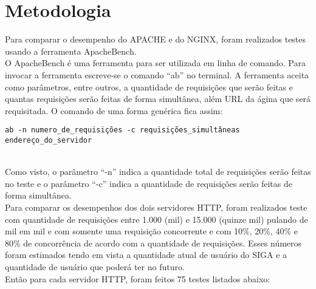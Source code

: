 \chapter{Metodologia}\label{metodologia}

Para comparar o desempenho do APACHE e do NGINX, foram realizados testes usando a ferramenta ApacheBench.\\

O ApacheBench é uma ferramenta para ser utilizada em linha de comando. Para invocar a ferramenta escreve-se o comando “ab” no terminal. A ferramenta aceita como parâmetros, entre outros, a quantidade de requisições que serão feitas e quantas requisições serão feitas de forma simultânea, além URL da \'{a}gina que ser\'{a} requisitada. O comando de uma forma genérica fica assim:\\
\begin{verbatim}
ab -n numero_de_requisições -c requisições_simultâneas endereço_do_servidor
\end{verbatim}\\
Como visto, o parâmetro “-n” indica a quantidade total de requisições serão feitas no teste e o parâmetro “-c” indica a quantidade de requisições serão feitas de forma simultânea.\\

Para comparar os desempenhos dos dois servidores HTTP, foram realizados teste com quantidade de requisições entre 1.000 (mil) e 15.000 (quinze mil) pulando de mil em mil e com somente uma requisição concorrente e com 10\%, 20\%, 40\% e 80\% de concorrência de acordo com a quantidade de requisições. Esses números foram estimados tendo em vista a quantidade atual de usuário do SIGA e a quantidade de usuário que poderá ter no futuro.\\

Então para cada servidor HTTP, foram feitos 75 testes listados abaixo:\\

